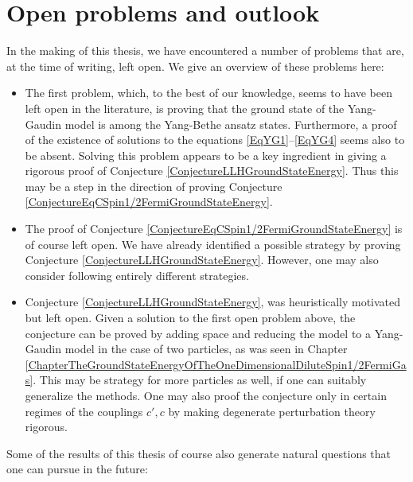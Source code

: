 \section{Open problems and outlook}
 In the making of this thesis, we have encountered a number of problems that are, at the time of writing, left open. We give an overview of these problems here:
 \begin{itemize}
 	\item The first problem, which, to the best of our knowledge, seems to have been left open in the literature, is proving that the ground state of the Yang-Gaudin model is among the Yang-Bethe ansatz states. Furthermore, a proof of the existence of solutions to the equations \eqref{EqYG1}--\eqref{EqYG4} seems also to be absent. Solving this problem appears to be a key ingredient in giving a rigorous proof of Conjecture \ref{ConjectureLLHGroundStateEnergy}. Thus this may be a step in the direction of proving Conjecture \ref{ConjectureEqCSpin1/2FermiGroundStateEnergy}.
 	\item The proof of Conjecture \ref{ConjectureEqCSpin1/2FermiGroundStateEnergy} is of course left open. We have already identified a possible strategy by proving Conjecture \ref{ConjectureLLHGroundStateEnergy}. However, one may also consider following entirely different strategies.
 	\item Conjecture \ref{ConjectureLLHGroundStateEnergy}, was heuristically motivated but left open. Given a solution to the first open problem above, the conjecture can be proved by adding space and reducing the model to a Yang-Gaudin model in the case of two particles, as was seen in Chapter \ref{ChapterTheGroundStateEnergyOfTheOneDimensionalDiluteSpin1/2FermiGas}. This may be strategy for more particles as well, if one can suitably generalize the methods. One may also proof the conjecture only in certain regimes of the couplings $ c',c $ by making degenerate perturbation theory rigorous.
 \end{itemize}
Some of the results of this thesis of course also generate natural questions that one can pursue in the future:
